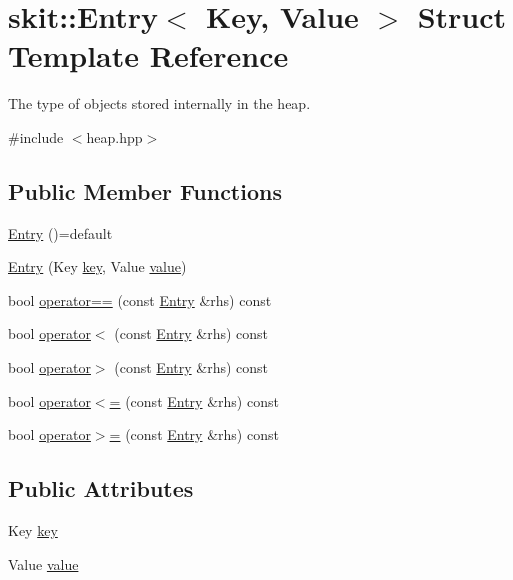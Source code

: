 \hypertarget{structskit_1_1Entry}{}\section{skit\+:\+:Entry$<$ Key, Value $>$ Struct Template Reference}
\label{structskit_1_1Entry}


The type of objects stored internally in the heap.  




{\ttfamily \#include $<$heap.\+hpp$>$}

\subsection*{Public Member Functions}
\begin{DoxyCompactItemize}
\item 
\hyperlink{structskit_1_1Entry_a7712b738e8f1417b9d4553f533eceaa6}{Entry} ()=default
\item 
\hyperlink{structskit_1_1Entry_ac18e178625a0a7e3ea5dc06a740c4e8d}{Entry} (Key \hyperlink{structskit_1_1Entry_a85d35e3246296b58e47330df3c18736a}{key}, Value \hyperlink{structskit_1_1Entry_aa1897a9b4bad03738812728966e4609c}{value})
\item 
bool \hyperlink{structskit_1_1Entry_ab02041d5c9779acdb50e391f6acc4dd0}{operator==} (const \hyperlink{structskit_1_1Entry}{Entry} \&rhs) const
\item 
bool \hyperlink{structskit_1_1Entry_a2f4f5018aeb4b52e420339775a6402d1}{operator$<$} (const \hyperlink{structskit_1_1Entry}{Entry} \&rhs) const
\item 
bool \hyperlink{structskit_1_1Entry_a625a98ad3d243386a87c5afa4571c9ca}{operator$>$} (const \hyperlink{structskit_1_1Entry}{Entry} \&rhs) const
\item 
bool \hyperlink{structskit_1_1Entry_a9d351890a0b1fe3e08d6b8738ec70982}{operator$<$=} (const \hyperlink{structskit_1_1Entry}{Entry} \&rhs) const
\item 
bool \hyperlink{structskit_1_1Entry_ac376fb663446d1eff4ebe8e08fe9ee06}{operator$>$=} (const \hyperlink{structskit_1_1Entry}{Entry} \&rhs) const
\end{DoxyCompactItemize}
\subsection*{Public Attributes}
\begin{DoxyCompactItemize}
\item 
Key \hyperlink{structskit_1_1Entry_a85d35e3246296b58e47330df3c18736a}{key}
\item 
Value \hyperlink{structskit_1_1Entry_aa1897a9b4bad03738812728966e4609c}{value}
\end{DoxyCompactItemize}
